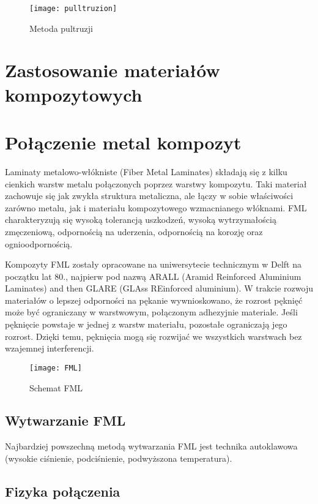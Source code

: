 \documentclass[magister,druk]{dyplom}
\begin{document}
\begin{figure}[H]
	\texttt{[image: pulltruzion]}
	\caption{Metoda pultruzji\cite{Chawla1998}}
\end{figure}

\section{Zastosowanie materiałów kompozytowych}
\section{Połączenie metal kompozyt}

Laminaty metalowo-włókniste (Fiber Metal Laminates) składają się z kilku cienkich warstw metalu połączonych poprzez warstwy kompozytu. Taki materiał zachowuje się jak zwykła struktura metaliczna, ale łączy w sobie właściwości zarówno metalu, jak i materiału kompozytowego wzmacnianego włóknami. FML charakteryzują się wysoką tolerancją uszkodzeń, wysoką wytrzymałością zmęczeniową, odpornością na uderzenia, odpornością na korozję oraz ognioodpornością\cite{FML}. 

Kompozyty FML zostały opracowane na uniwersytecie technicznym w Delft na początku lat 80., najpierw pod nazwą ARALL (Aramid Reinforced Aluminium Laminates) and then GLARE (GLAss REinforced aluminium). W trakcie rozwoju materiałów o lepszej odporności na pękanie wywnioskowano, że rozrost pęknięć może być ograniczany w warstwowym, połączonym adhezyjnie materiale. Jeśli pęknięcie powstaje w jednej z warstw materiału, pozostałe ograniczają jego rozrost. Dzięki temu, pęknięcia mogą się rozwijać we wszystkich warstwach bez wzajemnej interferencji. 



\begin{figure}[H]
	\texttt{[image: FML]}
	\centering
	\caption{Schemat FML\cite{FMLold}}
\end{figure}

\subsection{Wytwarzanie FML}

Najbardziej powszechną metodą wytwarzania FML jest technika autoklawowa (wysokie ciśnienie, podciśnienie, podwyższona temperatura). 

\subsection{Fizyka połączenia}
\end{document}

